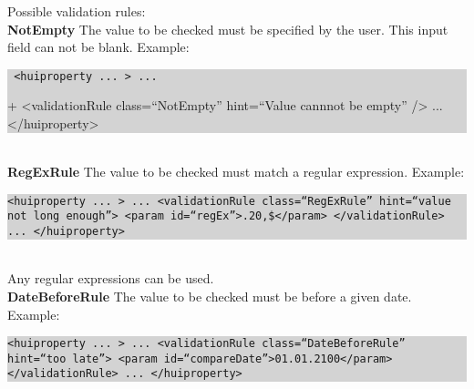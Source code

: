 \documentclass[a4paper,10pt]{book}
\begin{document}
Possible validation rules:
\newline\\
\textbf{NotEmpty}
\newline
The value to be checked must be specified by the user. This input field can not be blank.
\newline
Example:
\newline\\
\colorbox{lightgray}{\parbox{\textwidth}{
{\tt
<huiproperty ... > \newline
   ... \newline

+  <validationRule class=``NotEmpty'' hint=``Value cannnot be empty'' />\newline
   ...\newline
</huiproperty>}
}}
\newline\\
\textbf{RegExRule}
\newline
The value to be checked must match a regular expression.
\newline
Example:
\newline\\
\colorbox{lightgray}{\parbox{\textwidth}{
{\tt <huiproperty ... >\newline
   ...\newline
   <validationRule class=``RegExRule'' hint=``value not long enough''>\newline
      <param id=``regEx''>.{20,}\$</param>\newline
   </validationRule>\newline
   ...\newline
</huiproperty>}
}}
\newline\\
Any regular expressions can be used.
\newline\\
\textbf{DateBeforeRule}
\newline
The value to be checked must be before a given date.
\newline
Example:
\newline\\
\colorbox{lightgray}{\parbox{\textwidth}{
{\tt <huiproperty ... >\newline
   ...\newline
   <validationRule class=``DateBeforeRule'' hint=``too late''>\newline
      <param id=``compareDate''>01.01.2100</param>\newline
   </validationRule>\newline
   ...\newline
</huiproperty>}
}}
\end{document}
